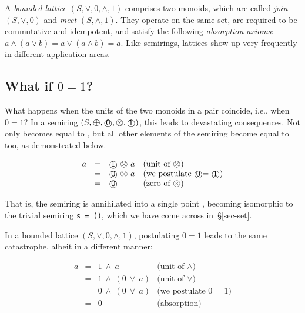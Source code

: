 \documentclass[english,submission]{programming}
\newcommand{\hcode}[1]{{\color{darkblue} \lstinline[keywordstyle={}]|#1|}} %
\newcommand{\add}{\text{\raisebox{-0.1mm}{\large $\oplus$}}}
\newcommand{\mul}{\text{\raisebox{-0.1mm}{\large $\otimes$}}}
\newcommand{\zero}{\raisebox{-0.2mm}{\textcircled{\textsf{0}}}\xspace}
\newcommand{\one}{\raisebox{-0.2mm}{\textcircled{\textsf{\hspace{-0.2mm}1}}}\xspace}
\begin{document}
A \emph{bounded lattice} $(S, \vee, 0, \wedge, 1)$ comprises two monoids, which
are called \emph{join} $(S, \vee, 0)$ and \emph{meet} $(S, \wedge, 1)$. They
operate on the same set, are required to be commutative and idempotent, and
satisfy the following \emph{absorption axioms}: $a \wedge (a \vee b) = a \vee (a \wedge b) = a$. Like semirings, lattices show up very frequently in different application
areas.

\subsection{What if $0=1$?}

What happens when the units of the two monoids in a pair coincide, i.e., when
$0=1$?
In a semiring $(S, \add, \zero, \mul, \one)$, this leads to devastating
consequences. Not only \one becomes equal to \zero, but all other elements of
the semiring become equal to \zero too, as demonstrated below.

\vspace{-5mm}
\begin{equation*}
\begin{array}{rcll}
a & = & \one\ \mul\ a & \text{(unit of $\mul$)}\\
 & = & \zero\ \mul\ a & \text{(we postulate \zero = \one)}\\
 & = & \zero & \text{(zero of $\mul$)}
\end{array}
\end{equation*}
\vspace{-3mm}

\noindent
That is, the semiring is annihilated into a single point \zero, becoming
isomorphic to the trivial semiring \hcode{s = ()}, which we have come across
in~\S\ref{sec-set}.

In a bounded lattice $(S, \vee, 0, \wedge, 1)$, postulating $0 = 1$ leads to the
same catastrophe, albeit in a different manner:

\vspace{-5mm}
\begin{equation*}
\begin{array}{rcll}
a & = & 1\ \wedge\ a & \text{(unit of $\wedge$)}\\
 & = & 1\ \wedge\ (0\  \vee\  a) & \text{(unit of $\vee$)}\\
 & = & 0\ \wedge\ (0\  \vee\  a) & \text{(we postulate 0 = 1)}\\
 & = & 0 & \text{(absorption)}
\end{array}
\end{equation*}
\vspace{-3mm}
\end{document}

